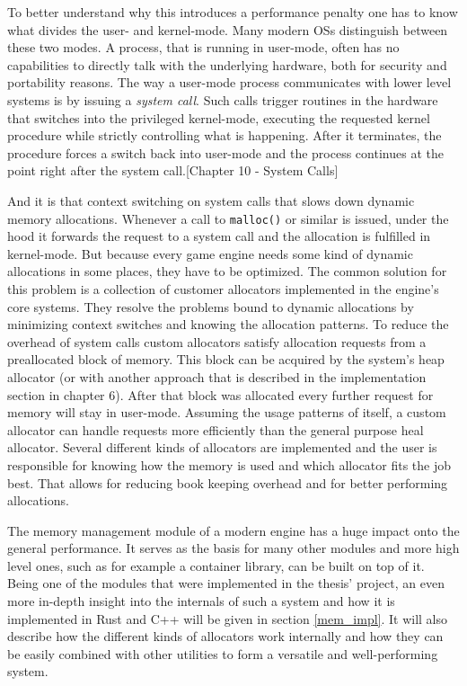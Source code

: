 To better understand why this introduces a performance penalty one has to know what divides the user- and kernel-mode. Many modern \acp{OS} distinguish between these two modes. A process, that is running in user-mode, often has no capabilities to directly talk with the underlying hardware, both for security and portability reasons. The way a user-mode process communicates with lower level systems is by issuing a \textit{system call}. Such calls trigger routines in the hardware that switches into the privileged kernel-mode, executing the requested kernel procedure while strictly controlling what is happening. After it terminates, the procedure forces a switch back into user-mode and the process continues at the point right after the system call.\cite{LinuxKernel}[Chapter 10 - System Calls]

And it is that context switching on system calls that slows down dynamic memory allocations. Whenever a call to \texttt{malloc()} or similar is issued, under the hood it forwards the request to a system call and the allocation is fulfilled in kernel-mode. But because every game engine needs some kind of dynamic allocations in some places, they have to be optimized. The common solution for this problem is a collection of customer allocators implemented in the engine's core systems. They resolve the problems bound to dynamic allocations by minimizing context switches and knowing the allocation patterns.
To reduce the overhead of system calls custom allocators satisfy allocation requests from a preallocated block of memory. This block can be acquired by the system's heap allocator (or with another approach that is described in the implementation section in chapter 6). After that block was allocated every further request for memory will stay in user-mode. Assuming the usage patterns of itself, a custom allocator can handle requests more efficiently than the general purpose heal allocator. Several different kinds of allocators are implemented and the user is responsible for knowing how the memory is used and which allocator fits the job best. That allows for reducing book keeping overhead and for better performing allocations.

The memory management module of a modern engine has a huge impact onto the general performance. It serves as the basis for many other modules and more high level ones, such as for example a container library, can be built on top of it. Being one of the modules that were implemented in the thesis' project, an even more in-depth insight into the internals of such a system and how it is implemented in Rust and C++ will be given in section \ref{mem_impl}. It will also describe how the different kinds of allocators work internally and how they can be easily combined with other utilities to form a versatile and well-performing system.

